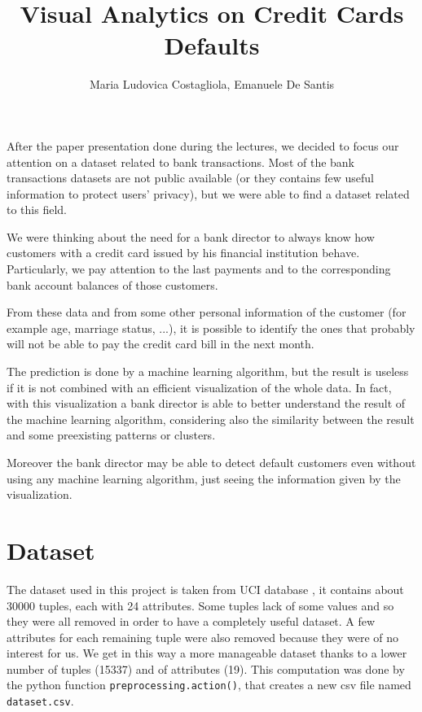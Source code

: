 \documentclass[journal]{vgtc}                %
\title{Visual Analytics on Credit Cards Defaults}
\author{Maria Ludovica Costagliola, Emanuele De Santis}
\begin{document}


\maketitle


After the paper presentation done during the lectures, we decided to focus our attention on a dataset related to bank transactions.
Most of the bank transactions datasets are not public available (or they contains few useful information to protect users' privacy), but we were able to find
a dataset related to this field.

We were thinking about the need for a bank director to always know how customers with a credit card issued by his financial institution behave. Particularly, we pay attention
to the last payments and to the corresponding bank account balances of those customers.

From these data and from some other personal information of the customer (for example age, marriage status, ...), it is possible to identify the ones that probably will not be able
to pay the credit card bill in the next month.

The prediction is done by a machine learning algorithm, but the result is useless if it is not combined with an efficient visualization of the whole data. In fact, with this visualization
a bank director is able to better understand the result of the machine learning algorithm, considering also the similarity between the result and some preexisting patterns or clusters.

Moreover the bank director may be able to detect default customers even without using any machine learning algorithm, just seeing the information given by the visualization.


\section{Dataset}
The dataset used in this project is taken from UCI database \cite{UCI:2016} , it contains about 30000 tuples, each with 24 attributes.
Some tuples lack of some values and so they were all removed in order to have a completely useful dataset. A few attributes for each remaining tuple were also removed because they were of no interest for us. We get in this way a more manageable dataset thanks to a lower number of tuples (15337) and of attributes (19).
This computation was done by the python function \texttt{preprocessing.action()}, that creates a new csv file named \texttt{dataset.csv}.
\end{document}
